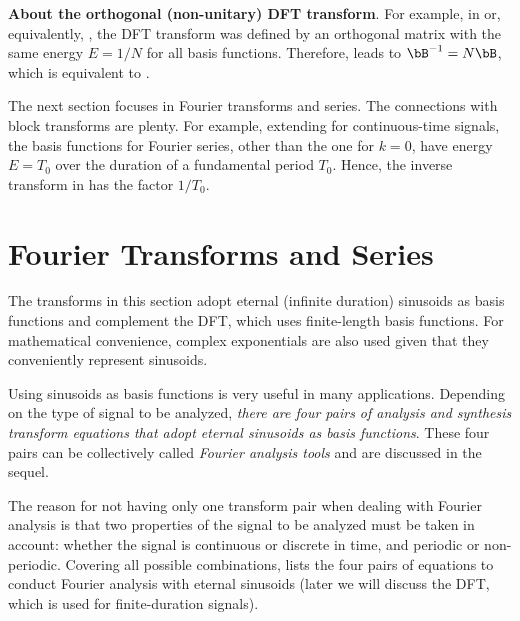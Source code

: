 \bExample \textbf{About the orthogonal (non-unitary) DFT transform}.
For example, in  or, equivalently, , the DFT transform was defined by an orthogonal matrix with the same energy $E=1/N$ for all basis functions. Therefore,  leads to $\bB^{-1}=N \bB$, which is equivalent to .
\eExample

The next section focuses in Fourier transforms and series. The connections with block transforms are plenty. For example, extending  for continuous-time signals, the basis functions for Fourier series, other than the one for $k=0$, have energy $E=T_0$ over the duration of a fundamental period $T_0$. Hence, the inverse transform in  has the factor $1/T_0$.

\section{Fourier Transforms and Series}

The transforms in this section adopt eternal (infinite duration) sinusoids as basis functions and complement the DFT, which uses finite-length basis functions. For mathematical convenience, complex exponentials are also used given that they conveniently represent sinusoids.

Using sinusoids as basis functions is very useful in many applications. Depending on the type of signal to be analyzed, \emph{there are four pairs of analysis and synthesis transform equations that adopt eternal sinusoids as basis functions}. These four pairs can be collectively called \emph{Fourier analysis tools} and are discussed in the sequel.


The reason for not having only one transform pair when dealing with Fourier analysis is that two properties of the signal to be analyzed must be taken in account: whether the signal is continuous or discrete in time, and periodic or non-periodic. Covering all possible combinations,  lists the four pairs of equations to conduct Fourier analysis with eternal sinusoids (later we will discuss the DFT, which is used for finite-duration signals).

